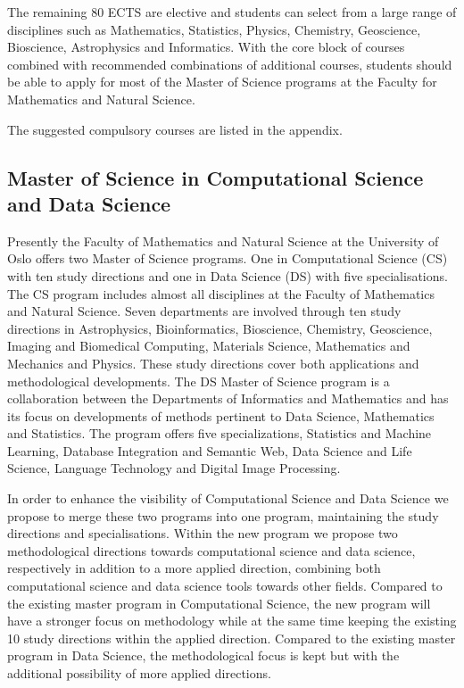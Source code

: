 \documentclass[oneside,final,10pt]{article}
\begin{document}
The remaining 80 ECTS are elective and students can select from a large range of disciplines such as Mathematics, Statistics, Physics, Chemistry, Geoscience, Bioscience, Astrophysics and Informatics. 
With the core block of courses combined with recommended combinations of additional courses,  students should be able to apply for most of the Master of Science programs at the Faculty for Mathematics and Natural Science. 

The suggested compulsory courses are listed in the appendix.

\subsection*{Master of Science in Computational Science and Data Science}

Presently the Faculty of Mathematics and Natural Science at the University of Oslo offers two Master of Science programs. One in Computational Science (CS) with ten study directions and one in Data Science (DS) with five specialisations. The CS program includes almost all disciplines at the Faculty of Mathematics and Natural Science. Seven departments are involved through ten study directions in Astrophysics, Bioinformatics, Bioscience, Chemistry, Geoscience, Imaging and Biomedical Computing, Materials Science, Mathematics and Mechanics and Physics. These study directions cover both applications and methodological developments. The DS Master of Science program is a collaboration between the Departments of Informatics and Mathematics and has its focus on developments of methods pertinent to Data Science, Mathematics  and Statistics.  
The program offers five specializations, 
Statistics and Machine Learning, Database Integration and Semantic Web, 
Data Science and Life Science, Language Technology and Digital Image Processing. 


In order to enhance the visibility of Computational Science and Data Science we propose to merge these two programs into one program, maintaining the study directions and specialisations. Within the new program we propose two methodological directions towards computational science and data science, respectively in addition to a more applied direction, combining both computational science and data science tools towards other fields. Compared to the existing master program in Computational Science, the new program will have a stronger focus on methodology while at the same time keeping the existing 10 study directions within the applied direction. Compared to the existing master program in Data Science, the methodological focus is kept but with the additional possibility of more applied directions.
\end{document}
